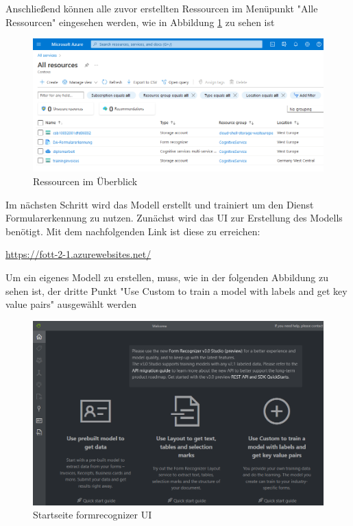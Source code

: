 Anschließend können alle zuvor erstellten Ressourcen im Menüpunkt "Alle Ressourcen" eingesehen werden, wie in Abbildung \ref{fig:ressourcen-überblick} zu sehen ist

\begin{figure}[h]
    \centering
    \includegraphics[scale=0.6]{sections/cloud-computing/images/alle-ressourcen.PNG}
    \caption{Ressourcen im Überblick}
    \label{fig:ressourcen-überblick}
\end{figure}

Im nächsten Schritt wird das Modell erstellt und trainiert um den Dienst Formularerkennung zu nutzen. Zunächst wird das UI zur Erstellung 
des Modells benötigt. Mit dem nachfolgenden Link ist diese zu erreichen: 

\begin{center}\url{https://fott-2-1.azurewebsites.net/}\end{center}

Um ein eigenes Modell zu erstellen, muss, wie in der folgenden Abbildung zu sehen ist, der dritte Punkt "Use Custom to train a model with labels and get key value pairs"
ausgewählt werden

\begin{figure}[h]
    \centering
    \includegraphics[scale=0.4]{sections/cloud-computing/images/formrecognizer-UI.PNG}
    \caption{Startseite formrecognizer UI}
    \label{fig:formrecognizer-UI}
\end{figure}

